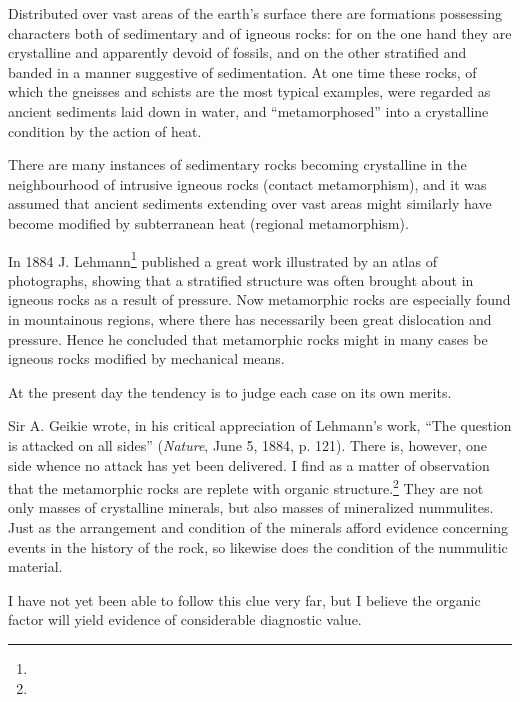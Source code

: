 \documentclass[a4paper, 12pt, oneside]{article}
\begin{document}
Distributed over vast areas of the earth's surface there are formations possessing characters both of sedimentary and of igneous rocks: for on the one hand they are crystalline and apparently devoid of fossils, and on the other stratified and banded in a manner suggestive of sedimentation. At one time these rocks, of which the gneisses and schists are the most typical examples, were regarded as ancient sediments laid down in water, and ``metamorphosed'' into a crystalline condition by the action of heat.

There are many instances of sedimentary rocks becoming crystalline in the neighbourhood of intrusive igneous rocks (contact metamorphism), and it was assumed that ancient sediments extending over vast areas might similarly have become modified by subterranean heat (regional metamorphism).

In 1884 J. Lehmann\footnote{} published a great work illustrated by an atlas of photographs, showing that a stratified structure was often brought about in igneous rocks as a result of pressure. Now metamorphic rocks are especially found in mountainous regions, where there has necessarily been great dislocation and pressure. Hence he concluded that metamorphic rocks might in many cases be igneous rocks modified by mechanical means.

At the present day the tendency is to judge each case on its own merits.

Sir A. Geikie wrote, in his critical appreciation of Lehmann's work, ``The question is attacked on all sides'' (\emph{Nature}, June 5, 1884, p. 121). There is, however, one side whence no attack has yet been delivered. I find as a matter of observation that the metamorphic rocks are replete with organic structure.\footnote{} They are not only masses of crystalline minerals, but also masses of mineralized nummulites. Just as the arrangement and condition of the minerals afford evidence concerning events in the history of the rock, so likewise does the condition of the nummulitic material.

I have not yet been able to follow this clue very far, but I believe the organic factor will yield evidence of considerable diagnostic value.
\end{document}
